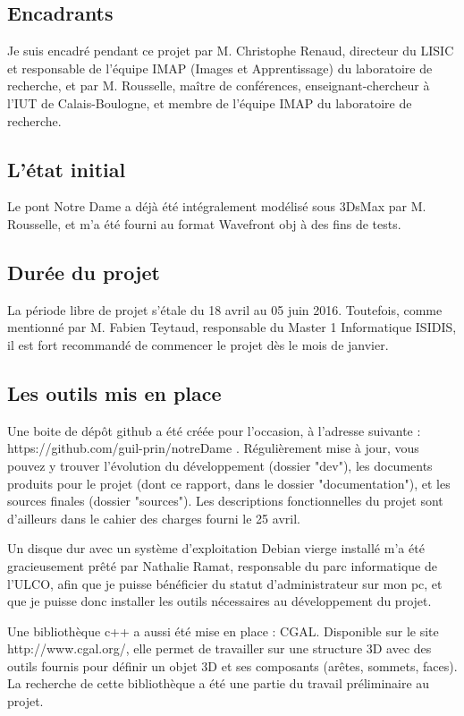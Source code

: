 \documentclass[a4paper,french]{article}
\begin{document}
		\subsection{Encadrants}
			Je suis encadré pendant ce projet par M. Christophe Renaud, directeur du LISIC et responsable de l'équipe IMAP (Images et Apprentissage) du laboratoire de recherche, et par M. Rousselle, maître de conférences, enseignant-chercheur à l'IUT de Calais-Boulogne, et membre de l'équipe IMAP du laboratoire de recherche.
		\subsection{L'état initial}
			Le pont Notre Dame a déjà été intégralement modélisé sous 3DsMax par M. Rousselle, et m'a été fourni au format Wavefront obj à des fins de tests. 
		\subsection{Durée du projet}
			La période libre de projet s'étale du 18 avril au 05 juin 2016. Toutefois, comme mentionné par M. Fabien Teytaud, responsable du Master 1 Informatique ISIDIS, il est fort recommandé de commencer le projet dès le mois de janvier.
		\subsection{Les outils mis en place}
			Une boite de dépôt github a été créée pour l'occasion, à l'adresse suivante :  https://github.com/guil-prin/notreDame . Régulièrement mise à jour, vous pouvez y trouver l'évolution du développement (dossier "dev"), les documents produits pour le projet (dont ce rapport, dans le dossier "documentation"), et les sources finales (dossier "sources"). Les descriptions fonctionnelles du projet sont d'ailleurs dans le cahier des charges fourni le 25 avril. \par
			Un disque dur avec un système d'exploitation Debian vierge installé m'a été gracieusement prêté par Nathalie Ramat, responsable du parc informatique de l'ULCO, afin que je puisse bénéficier du statut d'administrateur sur mon pc, et que je puisse donc installer les outils nécessaires au développement du projet. \par
			Une bibliothèque c++ a aussi été mise en place : CGAL. Disponible sur le site http://www.cgal.org/, elle permet de travailler sur une structure 3D avec des outils fournis pour définir un objet 3D et ses composants (arêtes, sommets, faces). La recherche de cette bibliothèque a été une partie du travail préliminaire au projet.
\end{document}
